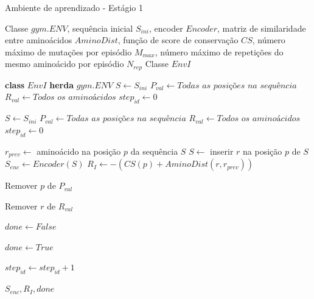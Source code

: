 \begin{algorithm}[H]
  \caption{Ambiente de aprendizado - Estágio 1}
  \label{alg:EnvI}
  \begin{algorithmic}[1]
  \Require Classe $gym.ENV$, 
  \State        sequência inicial $S_{ini}$,
  \State        encoder $Encoder$,
  \State        matriz de similaridade entre aminoácidos $\textit{AminoDist}$,
  \State        função de score de conservação $CS$,
  \State        número máximo de mutações por episódio $M_{max}$, 
  \State        número máximo de repetições do mesmo aminoácido por episódio $N_{rep}$
  \Ensure Classe $EnvI$
  
  \State \textbf{class} $EnvI$ \textbf{herda} $gym.ENV$
  \State \quad $S \gets S_{ini}$
  \State \quad $P_{val} \gets \textit{Todas as posições na sequência}$
  \State \quad $R_{val} \gets \textit{Todos os aminoácidos}$
  \State \quad $step_{id} \gets 0$

      \State $S \gets S_{ini}$
      \State $P_{val} \gets \textit{Todas as posições na sequência}$
      \State $R_{val} \gets \textit{Todos os aminoácidos}$
      \State $step_{id} \gets 0$
  \EndFunction

      \State $r_{prev} \gets$ aminoácido na posição $p$ da sequência $S$
      \State $S \gets$ inserir $r$ na posição $p$ de $S$
      \State $S_{enc} \gets Encoder(S)$ 
      \State $R_{I} \gets -(CS(p) + \textit{AminoDist}(r, r_{prev}))$

          \State Remover $p$ de $P_{val}$
      \EndIf

          \State Remover $r$ de $R_{val}$
      \EndIf

      \State $done \gets \textit{False}$

          \State $done \gets \textit{True}$ 
      \EndIf

      \State $step_{id} \gets step_{id} + 1$

      \State \Return $S_{enc}, R_{I}, done$
  \EndFunction

  \end{algorithmic}
\end{algorithm}


